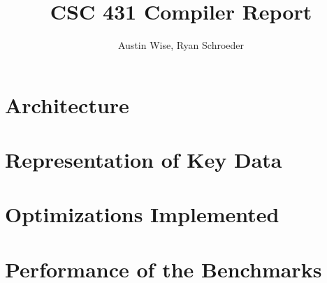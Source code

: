 \documentclass[12pt]{article}
\title{CSC 431 Compiler Report}
\date{}
\author{Austin Wise, Ryan Schroeder}
\begin{document}
\maketitle
\tableofcontents

\newpage

\section{Architecture}

\section{Representation of Key Data}
\section{Optimizations Implemented}
\section{Performance of the Benchmarks}
  
\end{document}
